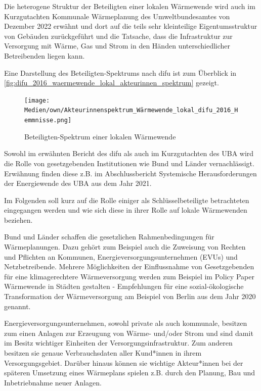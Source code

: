 			Die heterogene Struktur der Beteiligten einer lokalen Wärmewende wird auch im Kurzgutachten Kommunale Wärmeplanung des Umweltbundesamtes von Dezember 2022 erwähnt und dort auf die teils sehr kleinteilige Eigentumsstruktur von Gebäuden zurückgeführt und die Tatsache, dass die Infrastruktur zur Versorgung mit Wärme, Gas und Strom in den Händen unterschiedlicher Betreibenden liegen kann. \cite{uba_2022_kurzgutachten_waermeplanung}
			
			Eine Darstellung des Beteiligten-Spektrums nach difu ist zum Überblick in \autoref{fig:difu_2016_waermewende_lokal_akteurinnen_spektrum} gezeigt. \cite{difu_2016_waermewende_im_quartier_hemmnisse} 
			
			\begin{figure}[H]
				\centering
				\texttt{[image: Medien/own/Akteurinnenspektrum\_Wärmewende\_lokal\_difu\_2016\_Hemmnisse.png]}
				\caption{Beteiligten-Spektrum einer lokalen Wärmewende \cite[S.~19]{difu_2016_waermewende_im_quartier_hemmnisse}}
				\label{fig:difu_2016_waermewende_lokal_akteurinnen_spektrum}
			\end{figure}
			
			Sowohl im erwähnten Bericht des difu als auch im Kurzgutachten des UBA wird die Rolle von gesetzgebenden Institutionen wie Bund und Länder vernachlässigt. Erwähnung finden diese z.B. im Abschlussbericht Systemische Herausforderungen der Energiewende des UBA aus dem Jahr 2021. \cite[S.~345]{uba_2021_systemische_herausforderungen_der_energiewende_abschlussbericht}
			
			Im Folgenden soll kurz auf die Rolle einiger als Schlüsselbeteiligte betrachteten eingegangen werden und wie sich diese in ihrer Rolle auf lokale Wärmewenden beziehen.
			
			Bund und Länder schaffen die gesetzlichen Rahmenbedingungen für Wärmeplanungen. Dazu gehört zum Beispiel auch die Zuweisung von Rechten und Pflichten an Kommunen, Energieversorgungsunternehmen (EVUs) und Netzbetreibende. Mehrere Möglichkeiten der Einflussnahme von Gesetzgebenden für eine klimagerechtere Wärmeversorgung werden zum Beispiel im Policy Paper Wärmewende in Städten gestalten - Empfehlungen für eine sozial-ökologische Transformation der Wärmeversorgung am Beispiel von Berlin aus dem Jahr 2020 genannt. \cite{dunkelberg_2020_waermewende_in_staedten_gestalten}
			
			Energieversorgungsunternehmen, sowohl private als auch kommunale, besitzen zum einen Anlagen zur Erzeugung von Wärme- und/oder Strom und sind damit im Besitz wichtiger Einheiten der Versorgungsinfrastruktur. Zum anderen besitzen sie genaue Verbrauchsdaten aller Kund*innen in ihrem Versorgungsgebiet. Darüber hinaus können sie wichtige Akteur*innen bei der späteren Umsetzung eines Wärmeplans spielen z.B. durch den Planung, Bau und Inbetriebnahme neuer Anlagen. 
			
